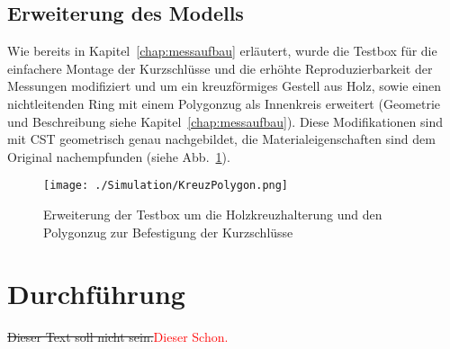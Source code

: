            
        \subsection{Erweiterung des Modells}
        Wie bereits in Kapitel~\ref{chap:messaufbau} erläutert, wurde die Testbox für die einfachere Montage der Kurzschlüsse und die erhöhte Reproduzierbarkeit der Messungen modifiziert und um ein kreuzförmiges Gestell aus Holz, sowie einen nichtleitenden Ring mit einem Polygonzug als Innenkreis erweitert (Geometrie und Beschreibung siehe Kapitel~\ref{chap:messaufbau}). Diese Modifikationen sind mit CST geometrisch genau nachgebildet, die Materialeigenschaften sind dem Original nachempfunden (siehe Abb.~\ref{fig:KreuzPolygonCST}).
        
            \begin{figure}[htb]
                \centering
                \texttt{[image: ./Simulation/KreuzPolygon.png]}
                \caption{Erweiterung der Testbox um die Holzkreuzhalterung und den Polygonzug zur Befestigung der Kurzschlüsse}
                \label{fig:KreuzPolygonCST}
            \end{figure}
        
    \section{Durchführung}
    
    
    \sout{Dieser Text soll nicht sein.}\textcolor{red}{Dieser Schon.}


